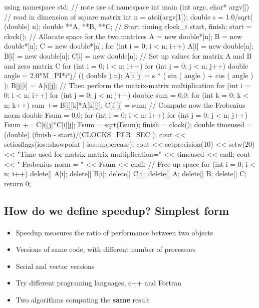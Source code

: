 \documentclass[%
oneside,                 %
final,                   %
10pt]{article}
\begin{document}
using namespace std; // note use of namespace
int main (int argc, char* argv[])
{
  // read in dimension of square matrix
  int n = atoi(argv[1]);
  double s = 1.0/sqrt( (double) n);
  double **A, **B, **C;
  // Start timing
  clock_t start, finish;
  start = clock();
  // Allocate space for the two matrices
  A = new double*[n]; B = new double*[n]; C = new double*[n];
  for (int i = 0; i < n; i++){
    A[i] = new double[n];
    B[i] = new double[n];
    C[i] = new double[n];
  }
  // Set up values for matrix A and B and zero matrix C
  for (int i = 0; i < n; i++){
    for (int j = 0; j < n; j++) {
      double angle = 2.0*M_PI*i*j/ (( double ) n);
      A[i][j] = s * ( sin ( angle ) + cos ( angle ) );
      B[j][i] =  A[i][j];
    }
  }
  // Then perform the matrix-matrix multiplication
  for (int i = 0; i < n; i++){
    for (int j = 0; j < n; j++) {
      double sum = 0.0;
       for (int k = 0; k < n; k++) {
           sum += B[i][k]*A[k][j];
       }
       C[i][j] = sum;
    }
  }
  // Compute now the Frobenius norm
  double Fsum = 0.0;
  for (int i = 0; i < n; i++){
    for (int j = 0; j < n; j++) {
      Fsum += C[i][j]*C[i][j];
    }
  }
  Fsum = sqrt(Fsum);
  finish = clock();
  double timeused = (double) (finish - start)/(CLOCKS_PER_SEC );
  cout << setiosflags(ios::showpoint | ios::uppercase);
  cout << setprecision(10) << setw(20) << "Time used  for matrix-matrix multiplication=" << timeused  << endl;
  cout << "  Frobenius norm  = " << Fsum << endl;
  // Free up space
  for (int i = 0; i < n; i++){
    delete[] A[i];
    delete[] B[i];
    delete[] C[i];
  }
  delete[] A;
  delete[] B;
  delete[] C;
  return 0;
}

\edat


\subsection{How do we define speedup? Simplest form}

\paragraph{}
\begin{itemize}
\item Speedup measures the ratio of performance between two objects

\item Versions of same code, with different number of processors

\item Serial and vector versions

\item Try different programing languages, c++ and Fortran

\item Two algorithms computing the \textbf{same} result 
\end{itemize}
\end{document}
